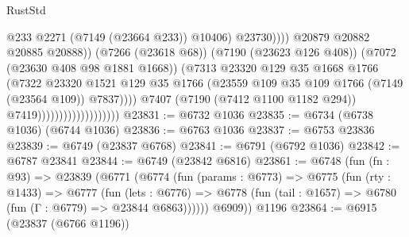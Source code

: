 \begin{lexlean}{RustStd}
\begin{coremodule}
                                                          @233
                                                          @2271
                                                          (@7149 (@23664 @233))
                                                          @10406)
                                                        @23730))))
                                                @20879
                                                @20882
                                                @20885
                                                @20888))
                                            (@7266 (@23618 @68))
                                            (@7190 (@23623 @126 @408))
                                            (@7072 (@23630 @408 @98 @1881 @1668))
                                            (@7313
                                              @23320
                                              @129
                                              @35
                                              @1668
                                              @1766
                                              (@7322
                                                @23320
                                                @1521
                                                @129
                                                @35
                                                @1766
                                                (@23559
                                                  @109
                                                  @35
                                                  @109
                                                  @1766
                                                  (@7149 (@23564 @109))
                                                  @7837))))
                                          @7407
                                          (@7190 (@7412 @1100 @1182 @294))
                                          @7419)))))))))))))))))))
@23831 := @6732 @1036
@23835 := @6734 (@6738 @1036) (@6744 @1036)
@23836 := @6763 @1036
@23837 := @6753 @23836
@23839 := @6749 (@23837 @6768)
@23841 := @6791 (@6792 @1036)
@23842 := @6787 @23841
@23844 := @6749 (@23842 @6816)
@23861 := @6748
    (fun (fn : @93) =>
    @23839
      (@6771
        (@6774
          (fun (params : @6773) =>
          @6775
            (fun (rty : @1433) =>
            @6777
              (fun (lets : @6776) =>
              @6778 (fun (tail : @1657) => @6780 (fun (Γ : @6779) => @23844 @6863))))))
        @6909))
    @1196
@23864 := @6915 (@23837 (@6766 @1196))

\end{coremodule}
\end{lexlean}
